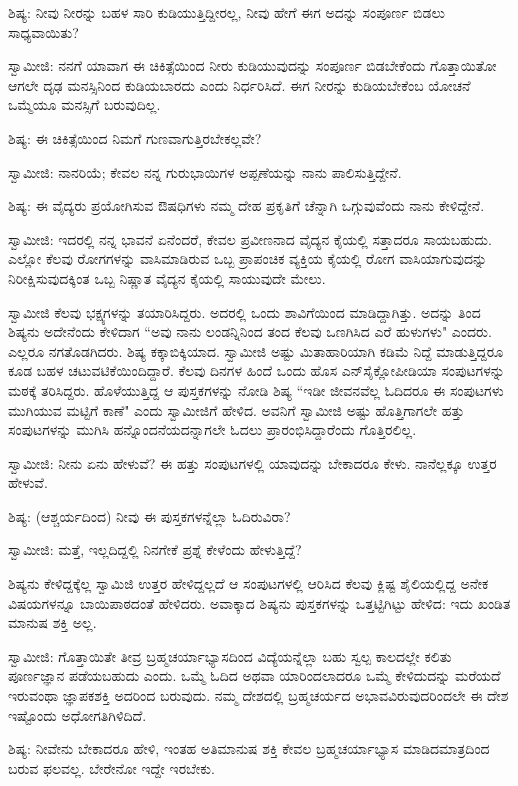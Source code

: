 ಶಿಷ್ಯ: ನೀವು ನೀರನ್ನು ಬಹಳ ಸಾರಿ ಕುಡಿಯುತ್ತಿದ್ದೀರಲ್ಲ, ನೀವು ಹೇಗೆ ಈಗ ಅದನ್ನು ಸಂಪೂರ್ಣ ಬಿಡಲು ಸಾಧ್ಯವಾಯಿತು?

ಸ್ವಾಮೀಜಿ: ನನಗೆ ಯಾವಾಗ ಈ ಚಿಕಿತ್ಸೆಯಿಂದ ನೀರು ಕುಡಿಯುವುದನ್ನು ಸಂಪೂರ್ಣ ಬಿಡಬೇಕೆಂದು ಗೊತ್ತಾಯಿತೋ ಆಗಲೇ ದೃಢ ಮನಸ್ಸಿನಿಂದ ಕುಡಿಯಬಾರದು ಎಂದು ನಿರ್ಧರಿಸಿದೆ. ಈಗ ನೀರನ್ನು ಕುಡಿಯಬೇಕೆಂಬ ಯೋಚನೆ ಒಮ್ಮೆಯೂ ಮನಸ್ಸಿಗೆ ಬರುವುದಿಲ್ಲ.

ಶಿಷ್ಯ: ಈ ಚಿಕಿತ್ಸೆಯಿಂದ ನಿಮಗೆ ಗುಣವಾಗುತ್ತಿರಬೇಕಲ್ಲವೇ?

ಸ್ವಾಮೀಜಿ: ನಾನರಿಯೆ; ಕೇವಲ ನನ್ನ ಗುರುಭಾಯಿಗಳ ಅಪ್ಪಣೆಯನ್ನು ನಾನು ಪಾಲಿಸುತ್ತಿದ್ದೇನೆ.

ಶಿಷ್ಯ: ಈ ವೈದ್ಯರು ಪ್ರಯೋಗಿಸುವ ಔಷಧಿಗಳು ನಮ್ಮ ದೇಹ ಪ್ರಕೃತಿಗೆ ಚೆನ್ನಾಗಿ ಒಗ್ಗುವುವೆಂದು ನಾನು ಕೇಳಿದ್ದೇನೆ.

ಸ್ವಾಮೀಜಿ: ಇದರಲ್ಲಿ ನನ್ನ ಭಾವನೆ ಏನೆಂದರೆ, ಕೇವಲ ಪ್ರವೀಣನಾದ ವೈದ್ಯನ ಕೈಯಲ್ಲಿ ಸತ್ತಾದರೂ ಸಾಯಬಹುದು. ಎಲ್ಲೋ ಕೆಲವು ರೋಗಗಳನ್ನು ವಾಸಿಮಾಡಿರುವ ಒಬ್ಬ ಪ್ರಾಪಂಚಿಕ ವ್ಯಕ್ತಿಯ ಕೈಯಲ್ಲಿ ರೋಗ ವಾಸಿಯಾಗುವುದನ್ನು ನಿರೀಕ್ಷಿಸುವುದಕ್ಕಿಂತ ಒಬ್ಬ ನಿಷ್ಣಾತ ವೈದ್ಯನ ಕೈಯಲ್ಲಿ ಸಾಯುವುದೇ ಮೇಲು.

ಸ್ವಾಮೀಜಿ ಕೆಲವು ಭಕ್ಷ್ಯಗಳನ್ನು ತಯಾರಿಸಿದ್ದರು. ಅದರಲ್ಲಿ ಒಂದು ಶಾವಿಗೆಯಿಂದ ಮಾಡಿದ್ದಾಗಿತ್ತು. ಅದನ್ನು ತಿಂದ ಶಿಷ್ಯನು ಅದೇನೆಂದು ಕೇಳಿದಾಗ “ಅವು ನಾನು ಲಂಡನ್ನಿನಿಂದ ತಂದ ಕೆಲವು ಒಣಗಿಸಿದ ಎರೆ ಹುಳುಗಳು" ಎಂದರು. ಎಲ್ಲರೂ ನಗತೊಡಗಿದರು. ಶಿಷ್ಯ ಕಕ್ಕಾಬಿಕ್ಕಿಯಾದ. ಸ್ವಾಮೀಜಿ ಅಷ್ಟು ಮಿತಾಹಾರಿಯಾಗಿ ಕಡಿಮೆ ನಿದ್ದೆ ಮಾಡುತ್ತಿದ್ದರೂ ಕೂಡ ಬಹಳ ಚಟುವಟಿಕೆಯಿಂದಿದ್ದಾರೆ. ಕೆಲವು ದಿನಗಳ ಹಿಂದೆ ಒಂದು ಹೊಸ ಎನ್‌ಸೈಕ್ಲೋಪೀಡಿಯಾ ಸಂಪುಟಗಳನ್ನು ಮಠಕ್ಕೆ ತರಿಸಿದ್ದರು. ಹೊಳೆಯುತ್ತಿದ್ದ ಆ ಪುಸ್ತಕಗಳನ್ನು ನೋಡಿ ಶಿಷ್ಯ “ಇಡೀ ಜೀವನವೆಲ್ಲ ಓದಿದರೂ ಈ ಸಂಪುಟಗಳು ಮುಗಿಯುವ ಮಟ್ಟಿಗೆ ಕಾಣೆ" ಎಂದು ಸ್ವಾಮೀಜಿಗೆ ಹೇಳಿದ. ಅವನಿಗೆ ಸ್ವಾಮೀಜಿ ಅಷ್ಟು ಹೊತ್ತಿಗಾಗಲೇ ಹತ್ತು ಸಂಪುಟಗಳನ್ನು ಮುಗಿಸಿ ಹನ್ನೊಂದನೆಯದನ್ನಾಗಲೇ ಓದಲು ಪ್ರಾರಂಭಿಸಿದ್ದಾರೆಂದು ಗೊತ್ತಿರಲಿಲ್ಲ.

ಸ್ವಾಮೀಜಿ: ನೀನು ಏನು ಹೇಳುವೆ? ಈ ಹತ್ತು ಸಂಪುಟಗಳಲ್ಲಿ ಯಾವುದನ್ನು ಬೇಕಾದರೂ ಕೇಳು. ನಾನೆಲ್ಲಕ್ಕೂ ಉತ್ತರ ಹೇಳುವೆ.

ಶಿಷ್ಯ: (ಆಶ್ಚರ್ಯದಿಂದ) ನೀವು ಈ ಪುಸ್ತಕಗಳನ್ನೆಲ್ಲಾ ಓದಿರುವಿರಾ?

ಸ್ವಾಮೀಜಿ: ಮತ್ತೆ, ಇಲ್ಲದಿದ್ದಲ್ಲಿ ನಿನಗೇಕೆ ಪ್ರಶ್ನೆ ಕೇಳೆಂದು ಹೇಳುತ್ತಿದ್ದೆ?

ಶಿಷ್ಯನು ಕೇಳಿದ್ದಕ್ಕೆಲ್ಲ ಸ್ವಾಮಿಜಿ ಉತ್ತರ ಹೇಳಿದ್ದಲ್ಲದೆ ಆ ಸಂಪುಟಗಳಲ್ಲಿ ಆರಿಸಿದ ಕೆಲವು ಕ್ಲಿಷ್ಟ ಶೈಲಿಯಲ್ಲಿದ್ದ ಅನೇಕ ವಿಷಯಗಳನ್ನೂ ಬಾಯಿಪಾಠದಂತೆ ಹೇಳಿದರು. ಅವಾಕ್ಕಾದ ಶಿಷ್ಯನು ಪುಸ್ತಕಗಳನ್ನು ಒತ್ತಟ್ಟಿಗಿಟ್ಟು ಹೇಳಿದ: ಇದು ಖಂಡಿತ ಮಾನುಷ ಶಕ್ತಿ ಅಲ್ಲ.

ಸ್ವಾಮೀಜಿ: ಗೊತ್ತಾಯಿತೇ ತೀವ್ರ ಬ್ರಹ್ಮಚರ್ಯಾಭ್ಯಾಸದಿಂದ ವಿದ್ಯೆಯನ್ನೆಲ್ಲಾ ಬಹು ಸ್ವಲ್ಪ ಕಾಲದಲ್ಲೇ ಕಲಿತು ಪೂರ್ಣಜ್ಞಾನ ಪಡೆಯಬಹುದು ಎಂದು. ಒಮ್ಮೆ ಓದಿದ ಅಥವಾ ಯಾರಿಂದಲಾದರೂ ಒಮ್ಮೆ ಕೇಳಿದುದನ್ನು ಮರೆಯದೆ ಇರುವಂಥಾ ಜ್ಞಾಪಕಶಕ್ತಿ ಅದರಿಂದ ಬರುವುದು. ನಮ್ಮ ದೇಶದಲ್ಲಿ ಬ್ರಹ್ಮಚರ್ಯದ ಅಭಾವವಿರುವುದರಿಂದಲೇ ಈ ದೇಶ ಇಷ್ಟೊಂದು ಅಧೋಗತಿಗಿಳಿದಿದೆ.

ಶಿಷ್ಯ: ನೀವೇನು ಬೇಕಾದರೂ ಹೇಳಿ, ಇಂತಹ ಅತಿಮಾನುಷ ಶಕ್ತಿ ಕೇವಲ ಬ್ರಹ್ಮಚರ್ಯಾಭ್ಯಾಸ ಮಾಡಿದಮಾತ್ರದಿಂದ ಬರುವ ಫಲವಲ್ಲ. ಬೇರೇನೋ ಇದ್ದೇ ಇರಬೇಕು.

